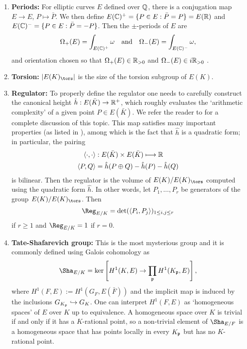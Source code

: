 \begin{enumerate}
    \item \textbf{Periods: } For elliptic curves $E$ defined over $\mathbb{Q}$, there is a conjugation map $E\to E$, $P\mapsto\bar{P}$. We then define $E(\mathbb{C})^+=\{P\in E:\bar{P}=P\}=E(\mathbb{R})$ and $E(\mathbb{C})^-=\{P\in E:\bar{P}=-P\}$. Then the $\pm$-periods of $E$ are 
    $$\Omega_+(E)=\int_{E(\mathbb{C})^+}\omega \quad\text{and}\quad\Omega_-(E)=\int_{E(\mathbb{C})^-}\omega,$$
    and orientation chosen so that $\Omega_+(E)\in\mathbb{R}_{>0}$ and $\Omega_-(E)\in i\mathbb{R}_{>0}$ .
    \item \textbf{Torsion:} $|E(K)_{\tors}|$ is the size of the torsion subgroup of $E(K)$.
    \item \textbf{Regulator:} To properly define the regulator one needs to carefully construct the canonical height $\hat{h}:E(\bar{K})\rightarrow\mathbb{R}^+$, which roughly evaluates the `arithmetic complexity' of a given point $P\in E(\bar{K})$. We refer the reader to \cite[Chapter VIII: \S4, \S5, \S6 and \S9]{S1} for a complete discussion of this topic. This map satisfies many important properties (as listed in \cite[Chapter VIII, Theorem 9.3]{S1}), among which is the fact that $\hat{h}$ is a quadratic form; in particular, the pairing
    \begin{align*}
        \langle\cdot,\cdot\rangle&:E(\bar{K})\times E(\bar{K})\longmapsto\mathbb{R}\\
        \langle P,Q\rangle&=\hat{h}(P\oplus Q)-\hat{h}(P)-\hat{h}(Q)
    \end{align*}
    is bilinear. Then the regulator is the volume of $E(K)/E(K)_{\tors}$ computed using the quadratic form $\hat{h}$. In other words, let $P_1,\ldots,P_r$ be generators of the group $E(K)/E(K)_{\tors}$. Then $$\Reg_{E/K}=\det(\langle P_i,P_j\rangle)_{1\leq i,j\leq r}$$
    if $r\geq1$ and $\Reg_{E/K}=1$ if $r=0$.
    \item \textbf{Tate-Shafarevich group:} This is the most mysterious group and it is commonly defined using Galois cohomology as
    $$\Sha_{E/K}=\ker\left[H^1(K,E)\rightarrow\prod_{\pp}H^1(K_\pp,E)\right],$$
    where $H^1(F,E):=H^1(G_F,E(\bar{F}))$ and the implicit map is induced by the inclusions $G_{K_{\mathfrak{p}}}\hookrightarrow G_K$. One can interpret $H^1(F,E)$ as `homogeneous spaces' of $E$ over $K$ up to equivalence. A homogeneous space over $K$ is trivial if and only if it has a $K$-rational point, so a non-trivial element of $\Sha_{E/F}$ is a homogeneous space that has points locally in every $K_{\mathfrak{p}}$ but has no $K$-rational point.


\end{enumerate}
